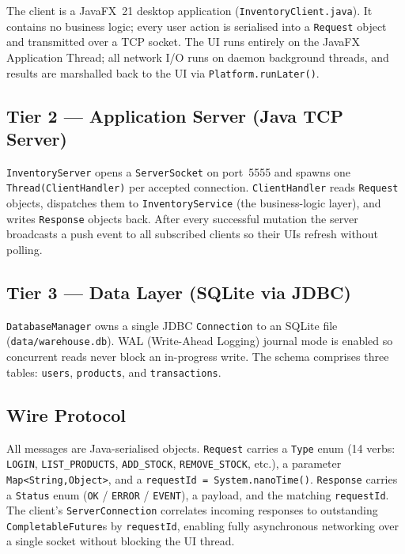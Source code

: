 \documentclass[12pt,a4paper]{article}
\begin{document}
The client is a JavaFX~21 desktop application (\texttt{InventoryClient.java}).
It contains no business logic; every user action is serialised into a
\texttt{Request} object and transmitted over a TCP socket. The UI runs entirely
on the JavaFX Application Thread; all network I/O runs on daemon background
threads, and results are marshalled back to the UI via
\texttt{Platform.runLater()}.

\subsection{Tier 2 --- Application Server (Java TCP Server)}

\texttt{InventoryServer} opens a \texttt{ServerSocket} on port~5555 and spawns
one \texttt{Thread(ClientHandler)} per accepted connection. \texttt{ClientHandler}
reads \texttt{Request} objects, dispatches them to \texttt{InventoryService} (the
business-logic layer), and writes \texttt{Response} objects back. After every
successful mutation the server broadcasts a push event to all subscribed clients so
their UIs refresh without polling.

\subsection{Tier 3 --- Data Layer (SQLite via JDBC)}

\texttt{DatabaseManager} owns a single JDBC \texttt{Connection} to an SQLite file
(\texttt{data/warehouse.db}). WAL (Write-Ahead Logging) journal mode is enabled so
concurrent reads never block an in-progress write. The schema comprises three tables:
\texttt{users}, \texttt{products}, and \texttt{transactions}.

\subsection{Wire Protocol}

All messages are Java-serialised objects. \texttt{Request} carries a \texttt{Type}
enum (14 verbs: \texttt{LOGIN}, \texttt{LIST\_PRODUCTS}, \texttt{ADD\_STOCK},
\texttt{REMOVE\_STOCK}, etc.), a parameter \texttt{Map<String,Object>}, and a
\texttt{requestId = System.nanoTime()}. \texttt{Response} carries a \texttt{Status}
enum (\texttt{OK} / \texttt{ERROR} / \texttt{EVENT}), a payload, and the matching
\texttt{requestId}. The client's \texttt{ServerConnection} correlates incoming
responses to outstanding \texttt{CompletableFuture}s by \texttt{requestId},
enabling fully asynchronous networking over a single socket without blocking the UI
thread.
\end{document}
